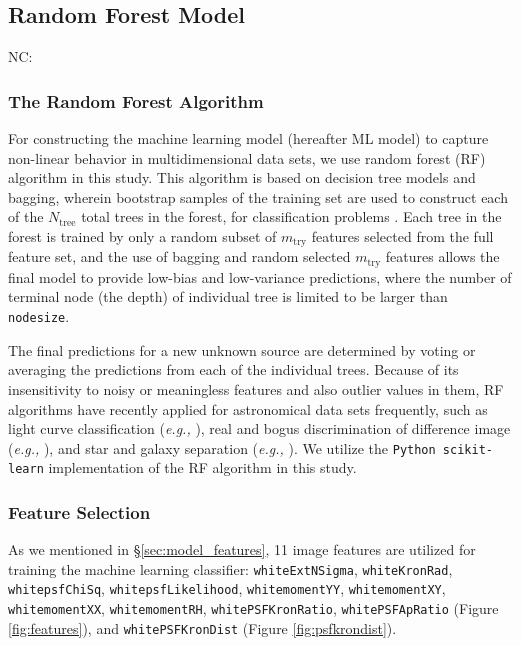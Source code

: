 \documentclass[twocolumn]{aastex62}
\newcommand{\NC}[1]{{\color{brown} NC: {#1}}}
\begin{document}
\subsection{Random Forest Model}\label{sec:rf_model}
\NC{
\subsubsection{The Random Forest Algorithm}\label{sec:rf_alg}
For constructing the machine learning model (hereafter ML model) 
to capture non-linear behavior in multidimensional data sets, 
we use random forest (RF) algorithm in this study.  
This algorithm is based on decision tree models \citep{Quinlan93} 
and bagging, 
wherein bootstrap samples of the training set are used to construct 
each of the $N_{\mathrm{tree}}$ total trees in the forest,
for classification problems \citep{Breiman96, Breiman01}. 
Each tree in the forest is trained by only a random subset of $m_{\mathrm{try}}$ 
features selected from the full feature set, 
and the use of bagging and random selected $m_{\mathrm{try}}$ features 
allows the final model to provide low-bias and low-variance predictions, 
where the number of terminal node (the depth) of individual tree is limited to be larger than \texttt{nodesize}. 

The final predictions for a new unknown source are determined by voting or averaging the predictions 
from each of the individual trees. 
Because of its insensitivity to noisy or meaningless features and also outlier values in them, 
RF algorithms have recently applied for astronomical data sets frequently, 
such as light curve classification ({\it e.g., } \citealt{Richards12a, Huppenkothen17}), 
real and bogus discrimination of difference image ({\it e.g., }  \citealt{Brink13, Wright15}), 
and star and galaxy separation ({\it e.g., } \citealt{Vasconcellos11, Miller17}). 
We utilize the \texttt{Python scikit-learn} implementation of the RF algorithm \citep{Pedregosa12} in this study. 

\subsubsection{Feature Selection}
As we mentioned in \S\ref{sec:model_features}, 11 image features are utilized for training the machine learning classifier: 
\texttt{whiteExtNSigma}, \texttt{whiteKronRad}, \texttt{whitepsfChiSq}, \texttt{whitepsfLikelihood}, 
\texttt{whitemomentYY}, \texttt{whitemomentXY}, \texttt{whitemomentXX}, \texttt{whitemomentRH}, 
\texttt{whitePSFKronRatio}, \texttt{whitePSFApRatio} (Figure \ref{fig:features}), 
and \texttt{whitePSFKronDist} (Figure \ref{fig:psfkrondist}). 

}
\end{document}
